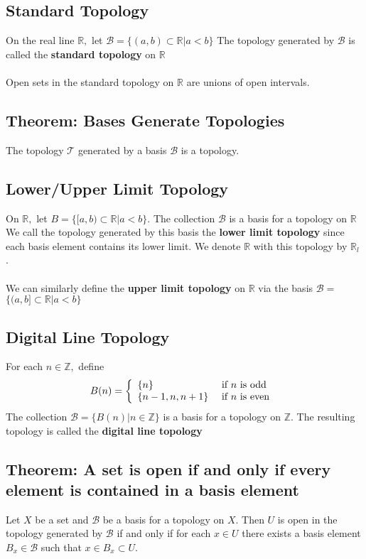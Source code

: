 \documentclass[12pt]{article}
\begin{document}
	\subsection{Standard Topology}
		On the real line $\mathbb { R } ,$ let $\mathcal { B } = \{ ( a , b ) \subset \mathbb { R } | a < b \}$ The topology generated by $\mathcal { B }$ is called the\textbf{ standard topology} on $\mathbb { R }$\\
		\\
		Open sets in the standard topology on $\mathbb { R }$ are unions of open intervals.
	\subsection{Theorem: Bases Generate Topologies}
	The topology $\mathcal { T }$ generated by a basis $\mathcal { B }$ is a topology.
	\subsection{Lower/Upper Limit Topology}
		On $\mathbb { R } ,$ let $B = \{ [ a , b ) \subset \mathbb { R } | a < b \} .$ The collection $\mathcal { B }$ is a basis for a topology on $\mathbb { R }$ We call the topology generated by this basis the \textbf{lower limit topology} since each basis element contains its lower limit. We denote $\mathbb { R }$ with this topology by $\mathbb { R } _ { l }$ .\\
		\\
		We can similarly define the \textbf{upper limit topology} on $\mathbb { R }$ via the basis $\mathcal { B } =$ $\{ ( a , b ] \subset \mathbb { R } | a < b \}$
	\subsection{Digital Line Topology}
		For each $n \in \mathbb { Z } ,$ define\\
			\[B ( n ) = \left\{ \begin{array} { l l } { \{ n \} } & { \text { if } n \text { is odd } } \\ { \{ n - 1 , n , n + 1 \} } & { \text { if } n \text { is even } } \end{array} \right.\]
		The collection $\mathcal { B } = \{ B ( n ) | n \in \mathbb { Z } \}$ is a basis for a topology on $\mathbb { Z } .$ The resulting topology is called the \textbf{digital line topology}
	\subsection{Theorem: A set is open if and only if every element is contained in a basis element}
		Let $X$ be a set and $\mathcal { B }$ be a basis for a topology on $X .$ Then $U$ is open in the topology generated by $\mathcal { B }$ if and only if for each $x \in U$ there
		exists a basis element $B _ { x } \in \mathcal { B }$ such that $x \in B _ { x } \subset U .$
\end{document}
